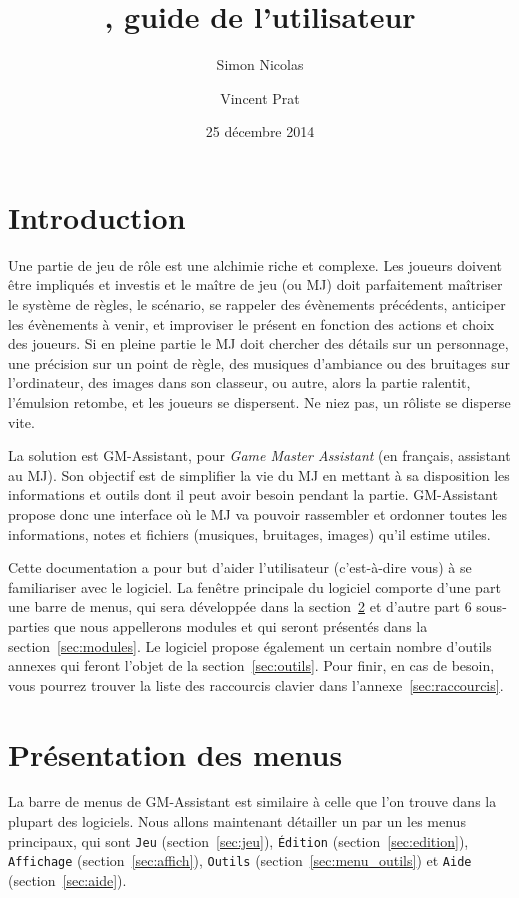 \documentclass[a4paper,12pt]{article}
\title{\GMA \versionnumber, guide de l'utilisateur}
\author{Simon Nicolas \and Vincent Prat}
\date{25 décembre 2014}
\newcommand*{\GMA}{GM-Assistant\xspace}
\newcommand*{\interfaceitem}[1]{\texttt{#1}}
\begin{document}
\maketitle

\tableofcontents

\section{Introduction}

Une partie de jeu de rôle est une alchimie riche et complexe.
Les joueurs doivent être impliqués et investis et le maître de jeu (ou MJ) doit parfaitement maîtriser le système de règles, le scénario, se rappeler des évènements précédents, anticiper les évènements à venir, et improviser le présent en fonction des actions et choix des joueurs.
Si en pleine partie le MJ doit chercher des détails sur un personnage, une précision sur un point de règle, des musiques d'ambiance ou des bruitages sur l'ordinateur, des images dans son classeur, ou autre, alors la partie ralentit, l'émulsion retombe, et les joueurs se dispersent.
Ne niez pas, un rôliste se disperse vite.

La solution est \GMA, pour \emph{Game Master Assistant} (en français, assistant au MJ).
Son objectif est de simplifier la vie du MJ en mettant à sa disposition les informations et outils dont il peut avoir besoin pendant la partie.
\GMA propose donc une interface où le MJ va pouvoir rassembler et ordonner toutes les informations, notes et fichiers (musiques, bruitages, images) qu'il estime utiles.

Cette documentation a pour but d'aider l'utilisateur (c'est-à-dire vous) à se familiariser avec le logiciel.
La fenêtre principale du logiciel comporte d'une part une barre de menus, qui sera développée dans la section~\ref{menu} et d'autre part 6 sous-parties que nous appellerons modules et qui seront présentés dans la section~\ref{sec:modules}.
Le logiciel propose également un certain nombre d'outils annexes qui feront l'objet de la section~\ref{sec:outils}.
Pour finir, en cas de besoin, vous pourrez trouver la liste des raccourcis clavier dans l'annexe~\ref{sec:raccourcis}. 

\section{Présentation des menus}
\label{menu}

La barre de menus de \GMA est similaire à celle que l'on trouve dans la plupart des logiciels.
Nous allons maintenant détailler un par un les menus principaux, qui sont \interfaceitem{Jeu} (section~\ref{sec:jeu}), \interfaceitem{Édition} (section~\ref{sec:edition}), \interfaceitem{Affichage} (section~\ref{sec:affich}), \interfaceitem{Outils} (section~\ref{sec:menu_outils}) et \interfaceitem{Aide} (section~\ref{sec:aide}).
\end{document}

